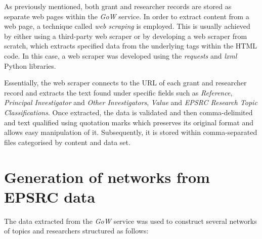 As previously mentioned, both grant and researcher records are stored as separate web pages within the \textit{GoW} service. In order to extract content from a web page, a technique called \textit{web scraping} is employed. This is usually achieved by either using a third-party web scraper or by developing a web scraper from scratch, which extracts specified data from the underlying tags within the HTML code. In this case, a web scraper was developed using the \textit{requests} and \textit{lxml} Python libraries.

Essentially, the web scraper connects to the URL of each grant and researcher record and extracts the text found under specific fields such as \textit{Reference}, \textit{Principal Investigator} and \textit{Other Investigators}, \textit{Value} and \textit{EPSRC Research Topic Classifications}. Once extracted, the data is validated and then comma-delimited and text qualified using quotation marks which preserves its original format and allows easy manipulation of it. Subsequently, it is stored within comma-separated files categorised by content and data set.

\clearpage

\section{Generation of networks from EPSRC data}

The data extracted from the \textit{GoW} service was used to construct several networks of topics and researchers structured as follows:

